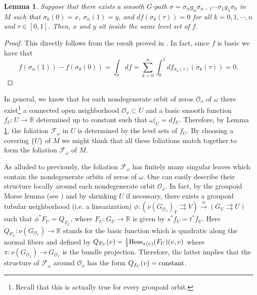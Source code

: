 \documentclass[
  a4paper, 
  reqno, 
  oneside, 
  12pt
]{amsart}
\newtheorem{lemma}[theorem]{Lemma}
\theoremstyle{definition}
\theoremstyle{remark}
\newcommand{\rr}{\rightrightarrows}
\begin{document}
 \begin{lemma}\label{Lemma1}
 Suppose that there exists a smooth $G$-path $\sigma=\sigma_ng_n\sigma_{n-1}\cdots \sigma_1g_1\sigma_0$ in $M$ such that $\sigma_0(0)=x$, $\sigma_n(1)=y$, and $df(\dot{\sigma}_k(\tau))=0$ for all $k=0,1,\cdots,n$ and $\tau\in [0,1]$. Then, $x$ and $y$ sit inside the same level set of $f$.
 \end{lemma}
 \begin{proof}
 This directly follows from the result proved in \cite[s. 3.1]{V}. In fact, since $f$ is basic we have that
 	$$f(\sigma_n(1))-f(\sigma_0(0))=\int_{\sigma}df=\sum_{k=0}^n\int_{0}^1df_{\sigma_k(\tau)}(\dot{\sigma}_k(\tau))=0.$$
 
 \end{proof}
 
In general, we know that for each nondegenerate orbit of zeros $\mathcal{O}_x$ of $\omega$ there exist\footnote{Recall that this is actually true for every groupoid orbit.} a connected open neighborhood $\mathcal{O}_x\subset U$ and a basic smooth function $f_U:U\to \mathbb{R}$ determined up to constant such that $\omega|_U=df_U$. Therefore, by Lemma \ref{Lemma1}, the foliation $\mathcal{F}_\omega$ in $U$ is determined by the level sets of $f_U$. By choosing a covering $\lbrace U\rbrace$ of $M$ we might think that all these foliations match together to form the foliation $\mathcal{F}_\omega$ of $M$. 
 
As alluded to previously, the foliation $\mathcal{F}_\omega$ has finitely many singular leaves which contain the nondegenerate orbits of zeros of $\omega$. One can easily describe their structure locally around each nondegenerate orbit $\mathcal{O}_x$. In fact, by the groupoid Morse lemma (see \cite[Thm. 5.2]{OV}) and by shrinking $U$ if necessary, there exists a groupoid tubular neighborhood (i.e. a linearization) $\phi: (\nu(G_{\mathcal{O}_x})_V\rr V)\xrightarrow[]{\cong} (G_U\rightrightarrows U)$ such that $\phi^\ast F_U=Q_{F_U}$, where $F_U:G_U\to \mathbb{R}$ is given by $s^\ast f_U=t^\ast f_U$. Here $Q_{F_U}:\nu(G_{\mathcal{O}_x})\to \mathbb{R}$ stands for the basic function which is quadratic along the normal fibers and defined by $Q_{F_U}(v)=\frac{1}{2}\textnormal{Hess}_{\pi(v)}(F_U)(v,v)$
where $\pi:\nu(G_{\mathcal{O}_x})\to G_{\mathcal{O}_x}$ is the bundle projection. Therefore, the latter implies that the structure of $\mathcal{F}_\omega$ around $\mathcal{O}_x$ has the form $Q_{f_U}(v)=\textnormal{constant}$.
\end{document}
